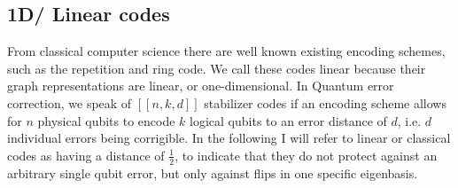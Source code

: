 


\subsection{1D/ Linear codes}
From classical computer science there are well known existing
encoding schemes, such as the repetition and ring code.
We call these codes linear because their graph representations are
linear, or one-dimensional. In Quantum error correction, we speak of $[[n,k,d]]$ stabilizer
codes if an encoding scheme allows for $n$ physical qubits to 
encode $k$ logical qubits to an error distance of $d$, i.e. $d$ individual errors 
being corrigible.
In the following I will refer to linear or classical codes as having a 
distance of $\frac{1}{2}$, to indicate that they do not protect against an
arbitrary single qubit error, but only against flips in one specific eigenbasis.


\newpage

\newpage

